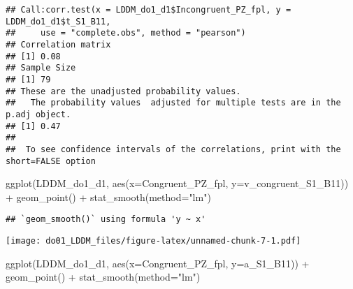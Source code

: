 \documentclass[
]{article}
\newenvironment{Shaded}{\begin{snugshade}}{\end{snugshade}}
\newcommand{\AttributeTok}[1]{\textcolor[rgb]{0.77,0.63,0.00}{#1}}
\newcommand{\FunctionTok}[1]{\textcolor[rgb]{0.00,0.00,0.00}{#1}}
\newcommand{\NormalTok}[1]{#1}
\newcommand{\SpecialCharTok}[1]{\textcolor[rgb]{0.00,0.00,0.00}{#1}}
\newcommand{\StringTok}[1]{\textcolor[rgb]{0.31,0.60,0.02}{#1}}
\begin{document}
\begin{Shaded}
\end{Shaded}

\begin{verbatim}
## Call:corr.test(x = LDDM_do1_d1$Incongruent_PZ_fpl, y = LDDM_do1_d1$t_S1_B11, 
##     use = "complete.obs", method = "pearson")
## Correlation matrix 
## [1] 0.08
## Sample Size 
## [1] 79
## These are the unadjusted probability values.
##   The probability values  adjusted for multiple tests are in the p.adj object. 
## [1] 0.47
## 
##  To see confidence intervals of the correlations, print with the short=FALSE option
\end{verbatim}

\begin{Shaded}
\begin{Highlighting}[]
\FunctionTok{ggplot}\NormalTok{(LDDM\_do1\_d1, }\FunctionTok{aes}\NormalTok{(}\AttributeTok{x=}\NormalTok{Congruent\_PZ\_fpl, }\AttributeTok{y=}\NormalTok{v\_congruent\_S1\_B11)) }\SpecialCharTok{+}
  \FunctionTok{geom\_point}\NormalTok{() }\SpecialCharTok{+}
  \FunctionTok{stat\_smooth}\NormalTok{(}\AttributeTok{method=}\StringTok{"lm"}\NormalTok{)}
\end{Highlighting}
\end{Shaded}

\begin{verbatim}
## `geom_smooth()` using formula 'y ~ x'
\end{verbatim}

\texttt{[image: do01\_LDDM\_files/figure-latex/unnamed-chunk-7-1.pdf]}

\begin{Shaded}
\begin{Highlighting}[]
\FunctionTok{ggplot}\NormalTok{(LDDM\_do1\_d1, }\FunctionTok{aes}\NormalTok{(}\AttributeTok{x=}\NormalTok{Congruent\_PZ\_fpl, }\AttributeTok{y=}\NormalTok{a\_S1\_B11)) }\SpecialCharTok{+}
  \FunctionTok{geom\_point}\NormalTok{() }\SpecialCharTok{+}
  \FunctionTok{stat\_smooth}\NormalTok{(}\AttributeTok{method=}\StringTok{"lm"}\NormalTok{)}
\end{Highlighting}
\end{Shaded}
\end{document}
